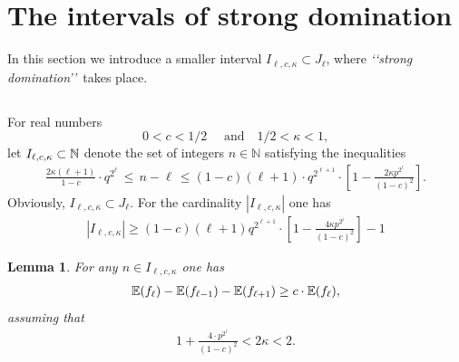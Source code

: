 \documentclass[10pt,a4paper]{amsart}
\newtheorem{lema}{Lemma}
\newcommand{\N}{\mathbb{N}}
\begin{document}
\section{The intervals of strong domination}


In this section we introduce  a smaller interval 
$I_{\ell, c, \kappa}\subset J_\ell$, where {\it \lq\lq strong domination\rq\rq}\   takes place.
\subsection{} For real numbers 
$$0<c<1/2\quad\mbox{ and}\quad  1/2 <\kappa<1,$$ let $I_{\ell,c, \kappa}\subset \Bbb N$ denote 
the set of integers $n\in \N$ satisfying the inequalities
\begin{eqnarray}\label{in:26a}
 \frac{2\kappa(\ell+1)}{1-c} \cdot q^{2^{\ell}}\, \le \, n-\ell \, \le
 (1-c)(\ell+1) \cdot q^{2^{\ell+1}}\cdot\left[1-\frac{2\kappa p^{2^{\ell}}}{(1-c)^2}\right].
 \end{eqnarray}
 Obviously, $I_{\ell, c, \kappa}\subset J_\ell$. For the cardinality $|I_{\ell, c, \kappa}|$ one has
 \begin{eqnarray}\label{eq:ilc}
|I_{\ell, c, \kappa}| \ge  (1-c)(\ell+1)q^{2^{\ell+1}}\cdot \left[1-\frac{4\kappa p^{2{^\ell}}}{(1-c)^2}\right]-1 %
 \end{eqnarray} 
\begin{lema} For any $n\in I_{\ell, c, \kappa}$ %
one has
\begin{eqnarray}\label{ineq:19a}
\Bbb E(f_{\ell})-\Bbb E(f_{\ell-1}) - \Bbb E(f_{\ell+1})\ge c \cdot\Bbb E(f_{\ell}),
\end{eqnarray}
assuming that \begin{eqnarray}\label{in:new1}
1+\frac{4\cdot p{^{2^\ell}}}{(1-c)^2}<2\kappa<2.
\end{eqnarray} %
\end{lema}
\end{document}

